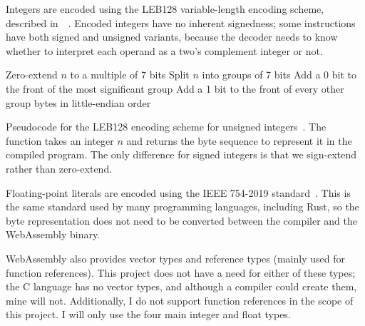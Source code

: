 \documentclass[00-main.tex]{subfiles}
\begin{document}
Integers are encoded using the LEB128 variable-length encoding scheme, described in~~.
Encoded integers have no inherent signedness; some instructions have both signed and unsigned variants, because the decoder needs to know whether to interpret each operand as a two's complement integer or not.


\begin{listing}[t]
  \begin{PseudocodeListing}
      \State Zero-extend $n$ to a multiple of 7 bits
      \State Split $n$ into groups of 7 bits
      \State Add a 0 bit to the front of the most significant group
      \State Add a 1 bit to the front of every other group
      \State \Return bytes in little-endian order
    \EndFunction
  \end{PseudocodeListing}
  \caption{Pseudocode for the LEB128 encoding scheme for unsigned integers~. The function takes an integer $n$ and returns the byte sequence to represent it in the compiled program. The only difference for signed integers is that we sign-extend rather than zero-extend.}
  \label{lst:leb128 pseudocode}
\end{listing}

Floating-point literals are encoded using the IEEE 754-2019 standard~. %
This is the same standard used by many programming languages, including Rust, so the byte representation does not need to be converted between the compiler and the WebAssembly binary.

WebAssembly also provides vector types and reference types (mainly used for function references).
This project does not have a need for either of these types; the C language has no vector types, and although a compiler could create them, mine will not.
Additionally, I do not support function references in the scope of this project.
I will only use the four main integer and float types.
\end{document}
